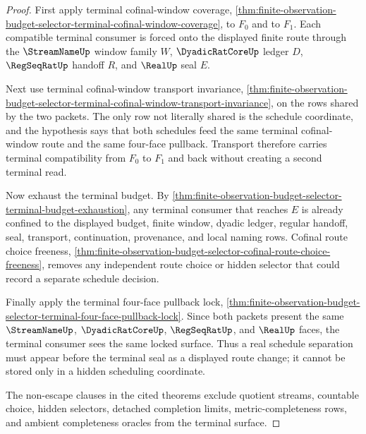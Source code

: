 \begin{proof}
First apply terminal cofinal-window coverage, \autoref{thm:finite-observation-budget-selector-terminal-cofinal-window-coverage}, to $F_0$ and to $F_1$. Each compatible terminal consumer is forced onto the displayed finite route through the $\StreamNameUp$ window family $W$, $\DyadicRatCoreUp$ ledger $D$, $\RegSeqRatUp$ handoff $R$, and $\RealUp$ seal $E$.

Next use terminal cofinal-window transport invariance, \autoref{thm:finite-observation-budget-selector-terminal-cofinal-window-transport-invariance}, on the rows shared by the two packets. The only row not literally shared is the schedule coordinate, and the hypothesis says that both schedules feed the same terminal cofinal-window route and the same four-face pullback. Transport therefore carries terminal compatibility from $F_0$ to $F_1$ and back without creating a second terminal read.

Now exhaust the terminal budget. By \autoref{thm:finite-observation-budget-selector-terminal-budget-exhaustion}, any terminal consumer that reaches $E$ is already confined to the displayed budget, finite window, dyadic ledger, regular handoff, seal, transport, continuation, provenance, and local naming rows. Cofinal route choice freeness, \autoref{thm:finite-observation-budget-selector-cofinal-route-choice-freeness}, removes any independent route choice or hidden selector that could record a separate schedule decision.

Finally apply the terminal four-face pullback lock, \autoref{thm:finite-observation-budget-selector-terminal-four-face-pullback-lock}. Since both packets present the same $\StreamNameUp$, $\DyadicRatCoreUp$, $\RegSeqRatUp$, and $\RealUp$ faces, the terminal consumer sees the same locked surface. Thus a real schedule separation must appear before the terminal seal as a displayed route change; it cannot be stored only in a hidden scheduling coordinate.

The non-escape clauses in the cited theorems exclude quotient streams, countable choice, hidden selectors, detached completion limits, metric-completeness rows, and ambient completeness oracles from the terminal surface.
\end{proof}

